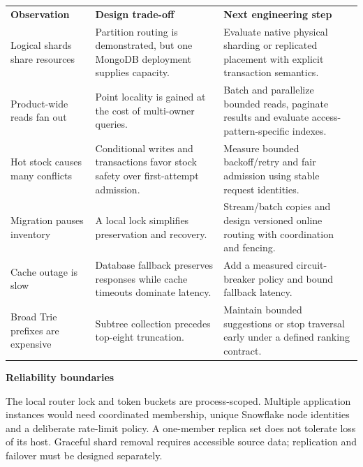 \documentclass[11pt,a4paper]{article}
\newcommand{\ReportHeading}[1]{%
  \par\addvspace{4bp}%
  {\sffamily\bfseries\color{Navy}\fontsize{11.3bp}{15bp}\selectfont #1\par}%
  \nobreak\vspace{-2bp}}
\begin{document}
\noindent\begin{minipage}{\linewidth}
\setlength{\parskip}{0pt}
\label{tab:report-18}
\begingroup\sffamily\fontsize{9.15bp}{11.895bp}\selectfont
\setlength{\tabcolsep}{5bp}\setlength{\extrarowheight}{6bp}
\renewcommand{\arraystretch}{1.15}
\begin{tabular}{>{\RaggedRight\arraybackslash}p{}>{\RaggedRight\arraybackslash}p{}>{\RaggedRight\arraybackslash}p{}}
\rowcolor{Navy}
\color{white}\bfseries Observation & \color{white}\bfseries Design trade-off & \color{white}\bfseries Next engineering step \\
Logical shards share resources & Partition routing is demonstrated, but one MongoDB deployment supplies capacity. & Evaluate native physical sharding or replicated placement with explicit transaction semantics. \\
Product-wide reads fan out & Point locality is gained at the cost of multi-owner queries. & Batch and parallelize bounded reads, paginate results and evaluate access-pattern-specific indexes. \\
Hot stock causes many conflicts & Conditional writes and transactions favor stock safety over first-attempt admission. & Measure bounded backoff/retry and fair admission using stable request identities. \\
Migration pauses inventory & A local lock simplifies preservation and recovery. & Stream/batch copies and design versioned online routing with coordination and fencing. \\
Cache outage is slow & Database fallback preserves responses while cache timeouts dominate latency. & Add a measured circuit-breaker policy and bound fallback latency. \\
Broad Trie prefixes are expensive & Subtree collection precedes top-eight truncation. & Maintain bounded suggestions or stop traversal early under a defined ranking contract. \\
\end{tabular}
\endgroup
\end{minipage}\par

\ReportHeading{7.1 Reliability boundaries}

The local router lock and token buckets are process-scoped. Multiple application instances would need
coordinated membership, unique Snowflake node identities and a deliberate rate-limit policy. A one-member
replica set does not tolerate loss of its host. Graceful shard removal requires accessible source data;
replication and failover must be designed separately.
\end{document}
